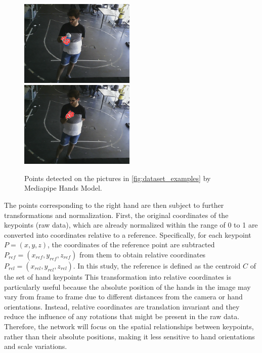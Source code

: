 \begin{figure}[ht]
    \centerline{\includegraphics[width=0.49\textwidth]{figs/dataset_preprocessing2_1.png} \ \includegraphics[width=0.49\textwidth]{figs/dataset_preprocessing2_2.png}}
    \caption{Points detected on the pictures in \autoref{fig:dataset_examples} by Mediapipe Hands Model.}
    \label{fig:dataset_examples2}
\end{figure}

The points corresponding to the right hand are then subject to further transformations and normalization. First, the original coordinates of the keypoints (raw data), which are already normalized within the range of 0 to 1 are converted into coordinates relative to a reference. Specifically, for each keypoint $P = (x,y,z)$, the coordinates of the reference point are subtracted $P_{ref} = (x_{ref}, y_{ref}, z_{ref})$ from them to obtain relative coordinates $P_{rel} = (x_{rel}, y_{rel}, z_{rel})$. In this study, the reference is defined as the centroid $C$ of the set of hand keypoints %
This transformation into relative coordinates is particularly useful because the absolute position of the hands in the image may vary from frame to frame due to different distances from the camera or hand orientations. Instead, relative coordinates are translation invariant and they reduce the influence of any rotations that might be present in the raw data. Therefore, the network will focus on the spatial relationships between keypoints, rather than their absolute positions, making it less sensitive to hand orientations and scale variations.

